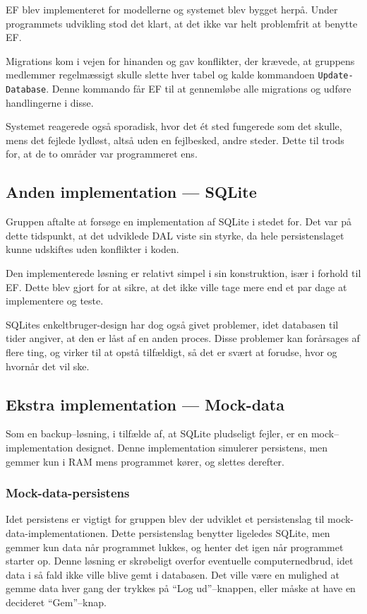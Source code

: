 \acl{EF} blev implementeret for modellerne og systemet blev bygget herpå.
Under programmets udvikling stod det klart, at det ikke var helt problemfrit at benytte \ac{EF}.

Migrations kom i vejen for hinanden og gav konflikter, der krævede, at gruppens medlemmer regelmæssigt skulle slette hver tabel og kalde kommandoen \texttt{Update-Database}.
Denne kommando får \ac{EF} til at gennemløbe alle migrations og udføre handlingerne i disse.

Systemet reagerede også sporadisk, hvor det ét sted fungerede som det skulle, mens det fejlede lydløst, altså uden en fejlbesked, andre steder.
Dette til trods for, at de to områder var programmeret ens.

\subsection{Anden implementation --- SQLite}

Gruppen aftalte at forsøge en implementation af SQLite i stedet for.
Det var på dette tidspunkt, at det udviklede \acl{DAL} viste sin styrke, da hele persistenslaget kunne udskiftes uden konflikter i koden.

Den implementerede løsning er relativt simpel i sin konstruktion, især i forhold til \acl{EF}.
Dette blev gjort for at sikre, at det ikke ville tage mere end et par dage at implementere og teste.

SQLites enkeltbruger-design har dog også givet problemer, idet databasen til tider angiver, at den er låst af en anden proces.
Disse problemer kan forårsages af flere ting, og virker til at opstå tilfældigt, så det er svært at forudse, hvor og hvornår det vil ske.

\subsection{Ekstra implementation --- Mock-data}

Som en backup--løsning, i tilfælde af, at SQLite pludseligt fejler, er en mock--implementation designet.
Denne implementation simulerer persistens, men gemmer kun i RAM mens programmet kører, og slettes derefter.

\subsubsection*{Mock-data-persistens}

Idet persistens er vigtigt for gruppen blev der udviklet et persistenslag til mock-data-implementationen.
Dette persistenslag benytter ligeledes SQLite, men gemmer kun data når programmet lukkes, og henter det igen når programmet starter op.
Denne løsning er skrøbeligt overfor eventuelle computernedbrud, idet data i så fald ikke ville blive gemt i databasen.
Det ville være en mulighed at gemme data hver gang der trykkes på ``Log ud''--knappen, eller måske at have en decideret ``Gem''--knap.


